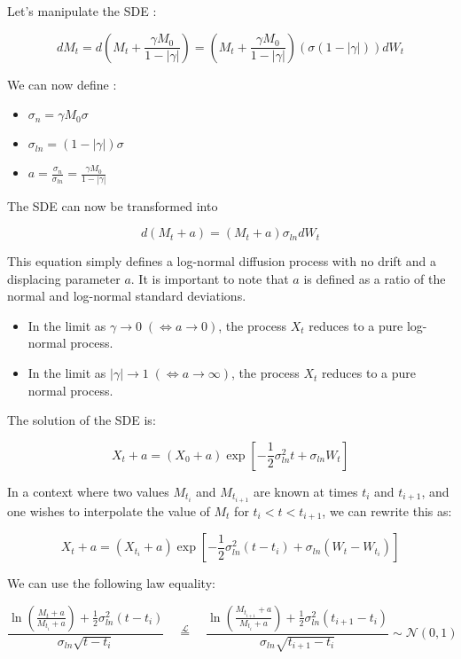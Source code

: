 \documentclass{article}
\begin{document}
Let's manipulate the SDE : 

$$dM_t = d(M_t + \frac{\gamma M_0}{1 - |\gamma|}) = (M_t + \frac{\gamma M_0}{1 - |\gamma|})(\sigma (1 - |\gamma|))dW_t$$

We can now define :

\begin{itemize}
    \item $\sigma_n = \gamma M_0 \sigma$
    \item $\sigma_{ln} = (1 - |\gamma|) \sigma$
    \item $a = \frac{\sigma_n}{\sigma_{ln}} = \frac{\gamma M_0}{1 - |\gamma|}$
\end{itemize}

The SDE can now be transformed into

    $$d(M_t + a) = (M_t + a)\sigma_{ln} dW_t$$

This equation simply defines a log-normal diffusion process with no drift and a displacing parameter $a$. It is important to note that $a$ is defined as a ratio of the normal and log-normal standard deviations.

\begin{itemize}
    \item In the limit as $\gamma \to 0 \; (\Leftrightarrow a \to 0)$, the process $X_t$ reduces to a pure log-normal process.
    \item In the limit as $|\gamma| \to 1 \; (\Leftrightarrow a \to \infty)$, the process $X_t$ reduces to a pure normal process.
\end{itemize}
The solution of the SDE is:

\[
X_t + a = (X_0 + a) \exp\left[-\frac{1}{2} \sigma_{ln}^2 t + \sigma_{ln} W_t\right]
\]

In a context where two values \( M_{t_i} \) and \( M_{t_{i+1}} \) are known at times \( t_i \) and \( t_{i+1} \), and one wishes to interpolate the value of \( M_t \) for \( t_i < t < t_{i+1} \), we can rewrite this as:

\[
X_t + a = (X_{t_i} + a) \exp\left[-\frac{1}{2} \sigma_{ln}^2 (t - t_i) + \sigma_{ln}(W_t - W_{t_i})\right]
\]

We can use the following law equality:

\[
\frac{\ln\left(\frac{M_t + a}{M_{t_i} + a}\right) + \frac{1}{2} \sigma_{ln}^2 (t - t_i)}{\sigma_{ln} \sqrt{t - t_i}} \quad \stackrel{\mathcal{L}}{=} \quad \frac{\ln\left(\frac{M_{t_{i+1}} + a}{M_{t_i} + a}\right) + \frac{1}{2} \sigma_{ln}^2 (t_{i+1} - t_i)}{\sigma_{ln} \sqrt{t_{i+1} - t_i}} \sim \mathcal{N}(0, 1)
\]
\end{document}
